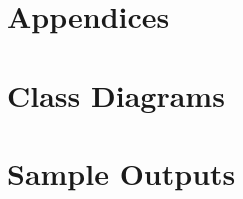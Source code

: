 \documentclass[a4paper,12pt]{article}
\begin{document}
\section*{Appendices}

\section*{Class Diagrams}

\section*{Sample Outputs}



\end{document}

